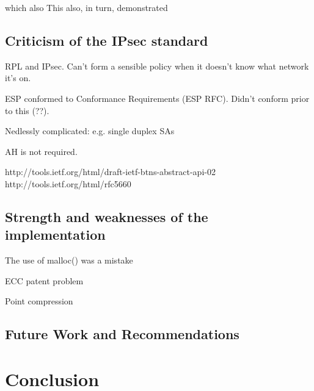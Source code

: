 \documentclass[final,a4paper,twoside,11pt,onecolumn]{report}
\begin{document}
which also This also, in turn, demonstrated

\section{Criticism of the IPsec standard}
RPL and IPsec. Can't form a sensible policy when it doesn't know what network it's on.

ESP conformed to Conformance Requirements (ESP RFC). Didn't conform prior to this (??).

Nedlessly complicated: e.g. single duplex SAs

AH is not required.

http://tools.ietf.org/html/draft-ietf-btns-abstract-api-02
http://tools.ietf.org/html/rfc5660

\section{Strength and weaknesses of the implementation}
The use of malloc() was a mistake

ECC patent problem

Point compression

\section{Future Work and Recommendations}
\label{sec:fw}


\chapter{Conclusion}







\end{document}
